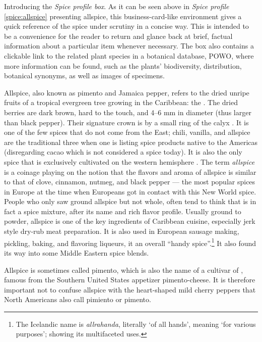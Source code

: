 \begin{note}
	Introducing the \textit{Spice profile box}. As it can be seen above in \textit{Spice profile} \ref{spice:allspice} presenting allspice, this business-card-like environment gives a quick reference of the spice under scrutiny in a concise way. This is intended to be a convenience for the reader to return and glance back at brief, factual information about a particular item whenever necessary. The box also contains a clickable link to the related plant species in a botanical database, \gls{POWO}, where more information can be found, such as the plants' biodiversity, distribution, botanical synonyms, as well as images of specimens.
\end{note}

Allspice, also known as pimento and Jamaica pepper, refers to the dried unripe fruits of a tropical evergreen tree growing in the Caribbean: the . The dried berries are dark brown, hard to the touch, and 4--6 mm in diameter (thus larger than black pepper). Their signature crown is by a small ring of the calyx \autocite[210]{van_wyk_culinary_2014}. It is one of the few spices that do not come from the East; chili, vanilla, and allspice are the traditional three when one is listing spice products native to the Americas (disregarding cacao which is not considered a spice today). It is also the only spice that is exclusively cultivated on the western hemisphere \autocite[21]{duke_crc_2002}. The term \textit{allspice} is a coinage playing on the notion that the flavors and aroma of allspice is similar to that of clove, cinnamon, nutmeg, and black pepper \autocite[717]{mabberley_mabberleys_2017} --- the most popular spices in Europe at the time when Europeans got in contact with this New World spice. People who only saw ground allspice but not whole, often tend to think that is in fact a spice mixture, after its name and rich flavor profile. Usually ground to powder, allspice is one of the key ingredients of Caribbean cuisine, especially jerk style dry-rub meat preparation. It is also used in European sausage making, pickling, baking, and flavoring liqueurs, it an overall ``handy spice''.\footnote{The Icelandic name is \textit{allrahanda}, literally `of all hands', meaning `for various purposes'; showing its multifaceted uses.} It also found its way into some Middle Eastern spice blends.


\begin{note}
\label{note:pimento}
Allspice is sometimes called pimento, which is also the name of a cultivar of , famous from the Southern United States appetizer pimento-cheese. It is therefore important not to confuse allspice with the heart-shaped mild cherry peppers that North Americans also call pimiento or pimento. 
\end{note}

